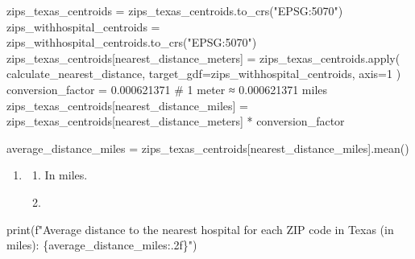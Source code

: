 \documentclass[
  letterpaper,
  DIV=11,
  numbers=noendperiod]{scrartcl}
\newenvironment{Shaded}{\begin{snugshade}}{\end{snugshade}}
\newcommand{\BuiltInTok}[1]{\textcolor[rgb]{0.00,0.23,0.31}{#1}}
\newcommand{\CommentTok}[1]{\textcolor[rgb]{0.37,0.37,0.37}{#1}}
\newcommand{\DecValTok}[1]{\textcolor[rgb]{0.68,0.00,0.00}{#1}}
\newcommand{\FloatTok}[1]{\textcolor[rgb]{0.68,0.00,0.00}{#1}}
\newcommand{\NormalTok}[1]{\textcolor[rgb]{0.00,0.23,0.31}{#1}}
\newcommand{\OperatorTok}[1]{\textcolor[rgb]{0.37,0.37,0.37}{#1}}
\newcommand{\SpecialCharTok}[1]{\textcolor[rgb]{0.37,0.37,0.37}{#1}}
\newcommand{\SpecialStringTok}[1]{\textcolor[rgb]{0.13,0.47,0.30}{#1}}
\newcommand{\StringTok}[1]{\textcolor[rgb]{0.13,0.47,0.30}{#1}}
\providecommand{\tightlist}{%
  \setlength{\itemsep}{0pt}\setlength{\parskip}{0pt}}\usepackage{longtable,booktabs,array}
\begin{document}
\begin{Shaded}
\begin{Highlighting}[]
\NormalTok{zips\_texas\_centroids }\OperatorTok{=}\NormalTok{ zips\_texas\_centroids.to\_crs(}\StringTok{"EPSG:5070"}\NormalTok{)}
\NormalTok{zips\_withhospital\_centroids }\OperatorTok{=}\NormalTok{ zips\_withhospital\_centroids.to\_crs(}\StringTok{"EPSG:5070"}\NormalTok{)}
\NormalTok{zips\_texas\_centroids[}\StringTok{\textquotesingle{}nearest\_distance\_meters\textquotesingle{}}\NormalTok{] }\OperatorTok{=}\NormalTok{ zips\_texas\_centroids.}\BuiltInTok{apply}\NormalTok{(}
\NormalTok{    calculate\_nearest\_distance, target\_gdf}\OperatorTok{=}\NormalTok{zips\_withhospital\_centroids, axis}\OperatorTok{=}\DecValTok{1}
\NormalTok{)}
\NormalTok{conversion\_factor }\OperatorTok{=} \FloatTok{0.000621371}  \CommentTok{\# 1 meter ≈ 0.000621371 miles}
\NormalTok{zips\_texas\_centroids[}\StringTok{\textquotesingle{}nearest\_distance\_miles\textquotesingle{}}\NormalTok{] }\OperatorTok{=}\NormalTok{ zips\_texas\_centroids[}\StringTok{\textquotesingle{}nearest\_distance\_meters\textquotesingle{}}\NormalTok{] }\OperatorTok{*}\NormalTok{ conversion\_factor}

\NormalTok{average\_distance\_miles }\OperatorTok{=}\NormalTok{ zips\_texas\_centroids[}\StringTok{\textquotesingle{}nearest\_distance\_miles\textquotesingle{}}\NormalTok{].mean()}
\end{Highlighting}
\end{Shaded}

\begin{enumerate}
\def\labelenumi{\arabic{enumi}.}
\setcounter{enumi}{4}
\tightlist
\item
  \begin{enumerate}
  \def\labelenumii{\alph{enumii}.}
  \tightlist
  \item
    In miles.
  \item
  \end{enumerate}
\end{enumerate}

\begin{Shaded}
\begin{Highlighting}[]
\BuiltInTok{print}\NormalTok{(}\SpecialStringTok{f"Average distance to the nearest hospital for each ZIP code in Texas (in miles): }\SpecialCharTok{\{}\NormalTok{average\_distance\_miles}\SpecialCharTok{:.2f\}}\SpecialStringTok{"}\NormalTok{)}
\end{Highlighting}
\end{Shaded}
\end{document}
